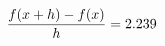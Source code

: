 \documentclass[preview]{standalone}
\begin{document}
\begin{align*}
\special{dvisvgm:raw <g id='unique000'>}\frac{f(x+h)-f(x)}{h} = 2.239\special{dvisvgm:raw </g>}
\end{align*}
\end{document}
